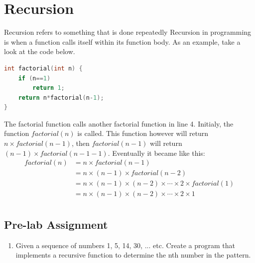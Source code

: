 \section{Recursion}
Recursion refers to something that is done repeatedly
Recursion in programming is when a function calls itself within its function body.
As an example, take a look at the code below.
\begin{lstlisting}[language=c,caption = Factorial with a recursion,label=lst:recursionexample01]
    int factorial(int n) {
    if (n==1)
        return 1;
    return n*factorial(n-1);
}
\end{lstlisting}
The factorial function calls another factorial function in line 4.
Initialy, the function $factorial(n)$ is called. This function however will return 
$n\times factorial(n-1)$, then $factorial(n-1)$ will return $(n-1)\times factorial(n-1-1)$.
Eventually it became like this:
\begin{equation*}
    \begin{split}
        factorial(n)& = n \times factorial(n-1)\\
        & = n \times (n-1) \times factorial(n-2)\\
        & = n \times (n-1) \times (n-2) \times \cdots \times 2 \times factorial(1)\\
        & = n \times (n-1) \times (n-2) \times \cdots \times 2 \times 1\\
    \end{split}
\end{equation*}

\subsection{Pre-lab Assignment}
\begin{enumerate}
    \item Given a sequence of numbers 1, 5, 14, 30, ... etc. Create a program that implements a recursive function to determine the nth number in the pattern.
\end{enumerate}